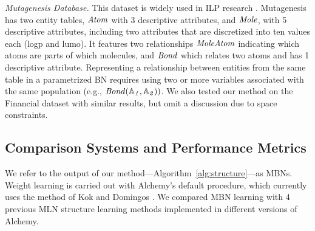 \documentclass[letterpaper]{article}
\begin{document}
{\em Mutagenesis Database.} This dataset is widely used in ILP research \cite{Srinivasan1996}. %
Mutagenesis has two entity tables, $\it{Atom}$ with 3 descriptive attributes, and $\it{Mole}$, with %
5 descriptive attributes, including two attributes that are discretized into ten values each (logp and lumo). It features two relationships $\it{MoleAtom}$ indicating which atoms are parts of which molecules, and $\it{Bond}$ which relates two atoms and has 1 descriptive attribute. %
Representing a relationship between entities from the same table in a parametrized BN requires using two or more variables associated with the same population (e.g., $\it{Bond}(\mathbb{A}_{1},\mathbb{A}_{2}))$.  
We also tested our method on the Financial dataset with similar results, but omit a discussion due to space constraints.

\subsection{Comparison Systems and Performance Metrics}

We refer to the output of our method---Algorithm~\ref{alg:structure}---as MBNs. Weight learning is carried out with Alchemy's default procedure, which currently uses the method of Kok and Domingos . 
We compared MBN learning with 4 previous MLN structure learning methods implemented in different versions of Alchemy.
\end{document}
